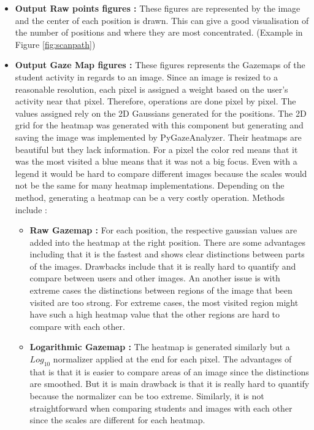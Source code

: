 \documentclass[a4paper,11pt]{report}
\numberwithin{figure}{chapter} %
\begin{document}
\begin{itemize}
        \item[\textbullet] \textbf{Output Raw points figures :} These figures are represented by the image and the center of each position is drawn.
        This can give a good visualisation of the number of positions and where they are most concentrated. (Example in Figure \ref{fig:scanpath})
        \item[\textbullet] \textbf{Output Gaze Map figures :} These figures represents the Gazemaps of the student activity in regards to an image.
        Since an image is resized to a reasonable resolution, each pixel is assigned a weight based on the user's activity near that pixel.
        Therefore, operations are done pixel by pixel.
        The values assigned rely on the 2D Gaussians generated for the positions.
        The 2D grid for the heatmap was generated with this component but generating and saving the image was implemented by PyGazeAnalyzer.
        Their heatmaps are beautiful but they lack information. For a pixel the color red means that it was the most visited a blue means that it was not a big focus.
        Even with a legend it would be hard to compare different images because the scales would not be the same for many heatmap implementations.
        Depending on the method, generating a heatmap can be a very costly operation.
        Methods include :
        \begin{itemize}
            \item \textbf{Raw Gazemap :} For each position, the respective gaussian values are added into the heatmap at the right position.
            There are some advantages including that it is the fastest and shows clear distinctions between parts of the images.
            Drawbacks include that it is really hard to quantify and compare between users and other images.
            An another issue is with extreme cases the distinctions between regions of the image that been visited are too strong.
            For extreme cases, the most visited region might have such a high heatmap value that the other regions are hard to compare with each other.
            \item \textbf{Logarithmic Gazemap :} The heatmap is generated similarly but a $Log_{10}$ normalizer applied at the end for each pixel.
            The advantages of that is that it is easier to compare areas of an image since the distinctions are smoothed.
            But it is main drawback is that it is really hard to quantify because the normalizer can be too extreme.
            Similarly, it is not straightforward when comparing students and images with each other since the scales are different for each heatmap.

\end{itemize}
\end{itemize}
\end{document}
